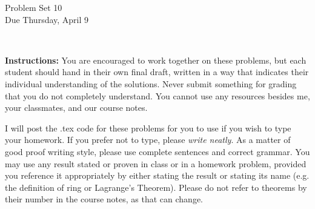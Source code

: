 \documentclass[11pt]{article}
\title{}
\date{\vspace{-0.5in}}
\theoremstyle{definition}
\begin{document}
\thispagestyle{fancy}
\pagestyle{fancy}

\vspace{3em}

\begin{center}
	{\LARGE Problem Set 10 \\}
	Due Thursday, April 9\end{center}

\

\noindent
{\bf Instructions:}
You are encouraged to work together on these problems, but each student should hand in their own final draft, written in a way that indicates their individual understanding of the solutions. Never submit something for grading that you do not completely understand. You cannot use any resources besides me, your classmates, and our course notes.


I will post the .tex code for these problems for you to use if you wish to type your homework. If you prefer not to type, please  {\em write neatly}. As a matter of good proof writing style, please use complete sentences and correct grammar. You may use any result stated or proven in class or in a homework problem, provided you reference it appropriately by either stating the result or stating its name (e.g. the definition of ring or Lagrange's Theorem). Please do not refer to theorems by their number in the course notes, as that can change.
\end{document}
